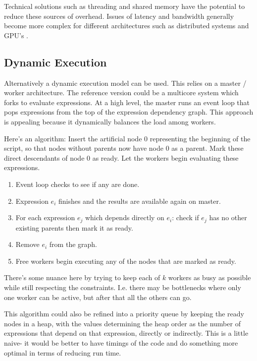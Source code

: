 \documentclass[12pt]{article}
\begin{document}
Technical solutions such as threading and shared
memory have the potential to reduce these sources of overhead.
Issues of latency and bandwidth generally become more complex for different
architectures such as distributed systems and GPU's
\cite{matloff2015parallel}.

\subsection{Dynamic Execution}
\label{sec:dynamic}

Alternatively a dynamic execution model can be used. This relies on a
master / worker architecture. The reference version could be a multicore
system which forks to evaluate expressions.  At a high level, the master
runs an event loop that pops expressions from the top of the expression
dependency graph.  This approach is appealing because it dynamically
balances the load among workers.

Here's an algorithm: Insert the artificial node 0 representing the beginning
of the script, so that nodes without parents now have node 0 as a parent. Mark
these direct descendants of node 0 as ready. Let the workers begin evaluating
these expressions.

\begin{enumerate}
    \item Event loop checks to see if any are done.
    \item Expression $e_i$ finishes and the results are available again
        on master.
    \item For each expression $e_j$ which depends directly on $e_i$: check
        if $e_j$ has no other existing parents then mark it as ready.
    \item Remove $e_i$ from the graph.
    \item Free workers begin executing any of the nodes that are marked as ready.
\end{enumerate}

There's some nuance here by trying to keep each of $k$ workers as busy as
possible while still respecting the constraints. I.e. there may be
bottlenecks where only one worker can be active, but after that all the
others can go.

This algorithm could also be refined into a priority queue by keeping the ready
nodes in a heap, with the values determining the heap order as the number
of expressions that depend on that expression, directly or indirectly. This
is a little naive- it would be better to have timings of the code and do
something more optimal in terms of reducing run time.
\end{document}
